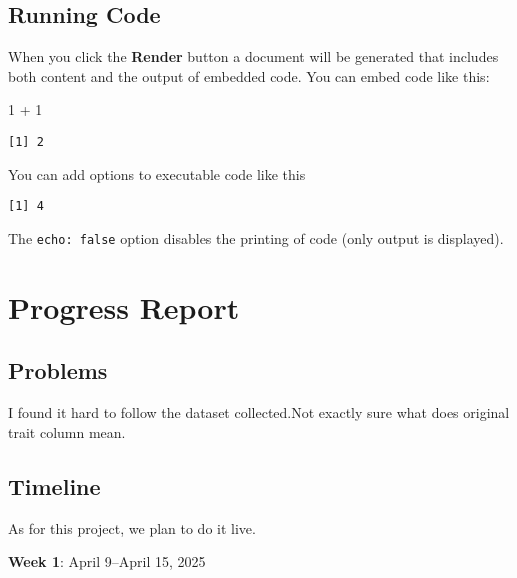 \documentclass[
  letterpaper,
  DIV=11,
  numbers=noendperiod]{scrreprt}
\newenvironment{Shaded}{\begin{snugshade}}{\end{snugshade}}
\newcommand{\DecValTok}[1]{\textcolor[rgb]{0.68,0.00,0.00}{#1}}
\newcommand{\SpecialCharTok}[1]{\textcolor[rgb]{0.37,0.37,0.37}{#1}}
\begin{document}
\section{Running Code}\label{running-code}

When you click the \textbf{Render} button a document will be generated
that includes both content and the output of embedded code. You can
embed code like this:

\begin{Shaded}
\begin{Highlighting}[]
\DecValTok{1} \SpecialCharTok{+} \DecValTok{1}
\end{Highlighting}
\end{Shaded}

\begin{verbatim}
[1] 2
\end{verbatim}

You can add options to executable code like this

\begin{verbatim}
[1] 4
\end{verbatim}

The \texttt{echo:\ false} option disables the printing of code (only
output is displayed).


\chapter{Progress Report}\label{progress-report}

\section{Problems}\label{problems}

I found it hard to follow the dataset collected.Not exactly sure what
does original trait column mean.

\section{Timeline}\label{timeline}

As for this project, we plan to do it live.

\textbf{Week 1}: April 9--April 15, 2025
\end{document}
